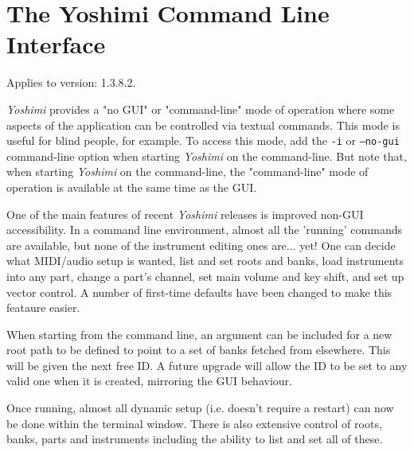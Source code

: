 %
%
%

\section{The Yoshimi Command Line Interface}
\label{sec:command_line}

   Applies to version:  1.3.8.2.

   \textsl{Yoshimi} provides a "no GUI" or "command-line" mode of operation
   where some aspects of the application can be controlled via textual commands.
   This mode is useful for blind people, for example.  To access this mode, add
   the \texttt{-i} or \texttt{--no-gui} command-line option when starting
   \textsl{Yoshimi} on the command-line.  But note that, when starting
   \textsl{Yoshimi} on the command-line, the "command-line" mode of operation is
   available at the same time as the GUI.

   One of the main features of recent \textsl{Yoshimi} releases
   is improved non-GUI
   accessibility.  In a command line environment, almost all the 'running'
   commands are available, but none of the instrument editing ones are... yet!
   One can decide what MIDI/audio setup is wanted, list and set roots and banks,
   load instruments into any part, change a part's channel, set main volume and
   key shift, and set up vector control.  A number of first-time defaults have
   been changed to make this feataure easier.

   When starting from the command line, an argument can be included for a new
   root path to be defined to point to a set of banks fetched from elsewhere.
   This will be given the next free ID. A future upgrade will allow the ID to
   be set to any valid one when it is created, mirroring the GUI behaviour.

   Once running, almost all dynamic setup (i.e. doesn't require a restart) can now
   be done within the terminal window. There is also extensive control of roots,
   banks, parts and instruments including the ability to list and set all of
   these.

